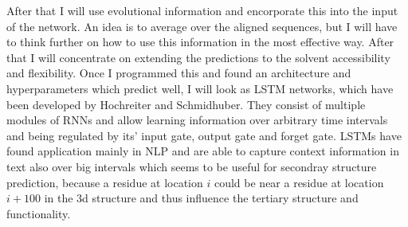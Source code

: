 \documentclass{article}
\begin{document}
After that I will use evolutional information and encorporate this into the input of the network. An idea is to average over the aligned sequences, but I will have to think further on how to use this information in the most effective way. After that I will concentrate on extending the predictions to the solvent accessibility and flexibility. Once I programmed this and found an architecture and hyperparameters which predict well, I will look as LSTM networks, which have been developed by Hochreiter and Schmidhuber. They consist of multiple modules of RNNs and allow learning information over arbitrary time intervals and being regulated by its' input gate, output gate and forget gate. LSTMs have found application mainly in NLP and are able to capture context information in text also over big intervals which seems to be useful for secondray structure prediction, because a residue at location $i$ could be near a residue at location $i+100$ in the 3d structure and thus influence the tertiary structure and functionality. \\ 
\end{document}
